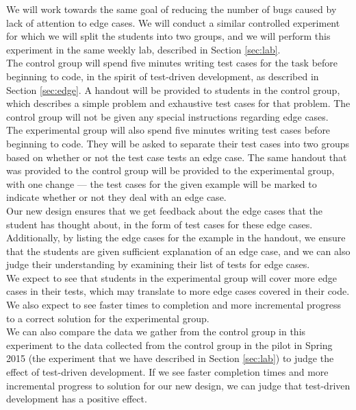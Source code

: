 \documentclass[11pt,letterpaper]{article}
\begin{document}
We will work towards the same goal of reducing the number of bugs caused by lack of attention to edge cases. We will conduct a similar controlled experiment for which we will split the students into two groups, and we will perform this experiment in the same weekly lab, described in Section \ref{sec:lab}.\\

The control group will spend five minutes writing test cases for the task before beginning to code, in the spirit of test-driven development, as described in Section \ref{sec:edge}. A handout will be provided to students in the control group, which describes a simple problem and exhaustive test cases for that problem. The control group will not be given any special instructions regarding edge cases.\\

The experimental group will also spend five minutes writing test cases before beginning to code. They will be asked to separate their test cases into two groups based on whether or not the test case tests an edge case. The same handout that was provided to the control group will be provided to the experimental group, with one change --- the test cases for the given example will be marked to indicate whether or not they deal with an edge case.\\

Our new design ensures that we get feedback about the edge cases that the student has thought about, in the form of test cases for these edge cases. Additionally, by listing the edge cases for the example in the handout, we ensure that the students are given sufficient explanation of an edge case, and we can also judge their understanding by examining their list of tests for edge cases.\\

We expect to see that students in the experimental group will cover more edge cases in their tests, which may translate to more edge cases covered in their code. We also expect to see faster times to completion and more incremental progress to a correct solution for the experimental group.\\

We can also compare the data we gather from the control group in this experiment to the data collected from the control group in the pilot in Spring 2015 (the experiment that we have described in Section \ref{sec:lab}) to judge the effect of test-driven development. If we see faster completion times and more incremental progress to solution for our new design, we can judge that test-driven development has a positive effect.
\end{document}
